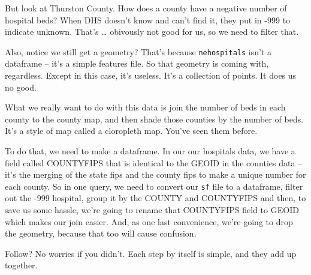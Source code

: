 \documentclass[]{book}
\newenvironment{Shaded}{\begin{snugshade}}{\end{snugshade}}
\newcommand{\DataTypeTok}[1]{\textcolor[rgb]{0.13,0.29,0.53}{#1}}
\newcommand{\DecValTok}[1]{\textcolor[rgb]{0.00,0.00,0.81}{#1}}
\newcommand{\KeywordTok}[1]{\textcolor[rgb]{0.13,0.29,0.53}{\textbf{#1}}}
\newcommand{\NormalTok}[1]{#1}
\newcommand{\OperatorTok}[1]{\textcolor[rgb]{0.81,0.36,0.00}{\textbf{#1}}}
\newcommand{\StringTok}[1]{\textcolor[rgb]{0.31,0.60,0.02}{#1}}
\begin{document}
But look at Thurston County. How does a county have a negative number of hospital beds? When DHS doesn't know and can't find it, they put in -999 to indicate unknown. That's \ldots{} obivously not good for us, so we need to filter that.

Also, notice we still get a geometry? That's because \texttt{nehospitals} isn't a dataframe -- it's a simple features file. So that geometry is coming with, regardless. Except in this case, it's useless. It's a collection of points. It does us no good.

What we really want to do with this data is join the number of beds in each county to the county map, and then shade those counties by the number of beds. It's a style of map called a cloropleth map. You've seen them before.

To do that, we need to make a dataframe. In our our hospitals data, we have a field called COUNTYFIPS that is identical to the GEOID in the counties data -- it's the merging of the state fips and the county fips to make a unique number for each county. So in one query, we need to convert our \texttt{sf} file to a dataframe, filter out the -999 hospital, group it by the COUNTY and COUNTYFIPS and then, to save us some hassle, we're going to rename that COUNTYFIPS field to GEOID which makes our join easier. And, as one last convenience, we're going to drop the geometry, because that too will cause confusion.

Follow? No worries if you didn't. Each step by itself is simple, and they add up together.

\begin{Shaded}
\end{Shaded}
\end{document}

